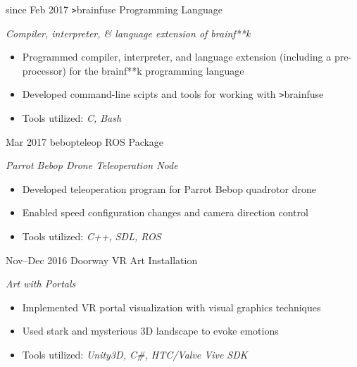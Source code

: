 \documentclass[]{friggeri-cv}
\begin{document}
\begin{entrylist}
  \entry
    {since Feb 2017}
    {\texttt{>}brainfuse}
    {Programming Language}
    {\emph{Compiler, interpreter, \& language extension of brainf**k}
    \begin{itemize}[leftmargin=1.2em]
    \item Programmed compiler, interpreter, and language extension (including a pre-processor) for the brainf**k programming language
    \item Developed command-line scipts and tools for working with \texttt{>}brainfuse
    \item Tools utilized: \emph{C, Bash}
    \end{itemize}}
    
  \entry
    {Mar 2017}
    {bebop\textunderscore teleop}
    {ROS Package}
    {\emph{Parrot Bebop Drone Teleoperation Node}
    \begin{itemize}[leftmargin=1.2em]
    \item Developed teleoperation program for Parrot Bebop quadrotor drone
    \item Enabled speed configuration changes and camera direction control
    \item Tools utilized: \emph{C++, SDL, ROS}
    \end{itemize}}
    
  \entry
    {Nov--Dec 2016}
    {Doorway}
    {VR Art Installation}
    {\emph{Art with Portals}
    \begin{itemize}[leftmargin=1.2em]
    \item Implemented VR portal visualization with visual graphics techniques
    \item Used stark and mysterious 3D landscape to evoke emotions
    \item Tools utilized: \emph{Unity3D, C\#,  HTC/Valve Vive SDK}
    \end{itemize}}

\end{entrylist}
\end{document}
